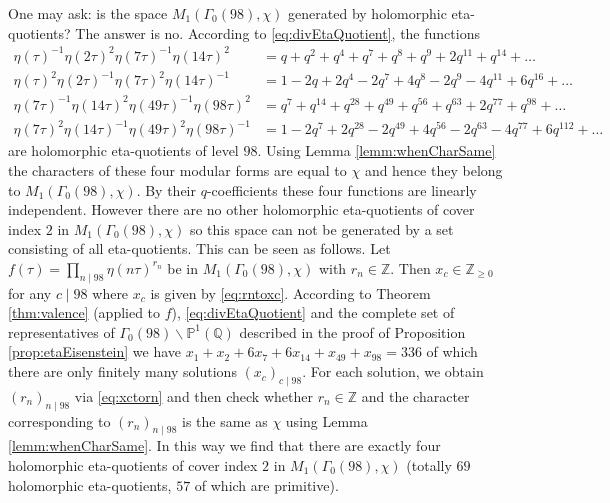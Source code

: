 \documentclass[12pt]{amsart}
\numberwithin{equation}{section}
\theoremstyle{plain}
\theoremstyle{definition}
\theoremstyle{remark}
\newcommand\rad{\mathop{\mathrm{rad}}}
\newcommand\numZ{\mathbb{Z}}
\newcommand\projQ{\mathbb{P}^1(\mathbb{Q})}
\newcommand\numgeq[2]{\mathbb{#1}_{\geq #2}}
\begin{document}
One may ask: is the space $M_1(\Gamma_0(98),\chi)$ generated by holomorphic eta-quotients? The answer is no. According to \eqref{eq:divEtaQuotient}, the functions
\begin{align*}
\eta(\tau)^{-1}\eta(2\tau)^2\eta(7\tau)^{-1}\eta(14\tau)^{2}&=q+q^2+q^4+q^7+q^8+q^9+2q^{11}+q^{14}+\dots\\
\eta(\tau)^{2}\eta(2\tau)^{-1}\eta(7\tau)^{2}\eta(14\tau)^{-1}&=1-2q+2q^4-2q^7+4q^8-2q^9-4q^{11}+6q^{16}+\dots\\
\eta(7\tau)^{-1}\eta(14\tau)^2\eta(49\tau)^{-1}\eta(98\tau)^{2}&=q^7+q^{14}+q^{28}+q^{49}+q^{56}+q^{63}+2q^{77}+q^{98}+\dots\\
\eta(7\tau)^{2}\eta(14\tau)^{-1}\eta(49\tau)^{2}\eta(98\tau)^{-1}&=1-2q^7+2q^{28}-2q^{49}+4q^{56}-2q^{63}-4q^{77}+6q^{112}+\dots
\end{align*}
are holomorphic eta-quotients of level $98$. Using Lemma \ref{lemm:whenCharSame} the characters of these four modular forms are equal to $\chi$ and hence they belong to $M_1(\Gamma_0(98),\chi)$. By their $q$-coefficients these four functions are linearly independent. However there are no other holomorphic eta-quotients of cover index $2$ in $M_1(\Gamma_0(98),\chi)$ so this space can not be generated by a set consisting of all eta-quotients. This can be seen as follows. Let $f(\tau)=\prod_{n\mid98}\eta(n\tau)^{r_n}$ be in $M_1(\Gamma_0(98),\chi)$ with $r_n\in\numZ$. Then $x_c\in\numgeq{Z}{0}$ for any $c\mid 98$ where $x_c$ is given by \eqref{eq:rntoxc}. According to Theorem \ref{thm:valence} (applied to $f$), \eqref{eq:divEtaQuotient} and the complete set of representatives of $\Gamma_0(98)\backslash\projQ$ described in the proof of Proposition \ref{prop:etaEisenstein} we have $x_1+x_2+6x_7+6x_{14}+x_{49}+x_{98}=336$ of which there are only finitely many solutions $(x_c)_{c\mid 98}$. For each solution, we obtain $(r_n)_{n\mid98}$ via \eqref{eq:xctorn} and then check whether $r_n\in\numZ$ and the character corresponding to $(r_n)_{n\mid98}$ is the same as $\chi$ using Lemma \ref{lemm:whenCharSame}. In this way we find that there are exactly four holomorphic eta-quotients of cover index $2$ in $M_1(\Gamma_0(98),\chi)$ (totally $69$ holomorphic eta-quotients, $57$ of which are primitive).%

\end{document}

